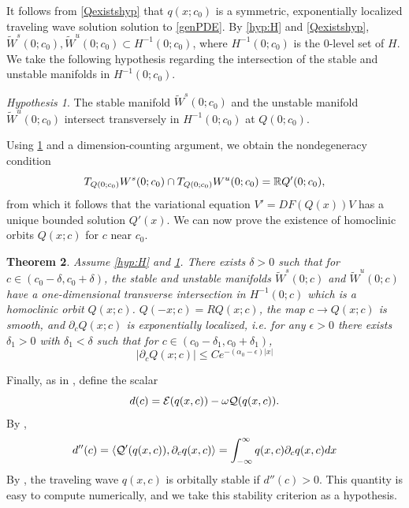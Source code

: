 \documentclass[10pt,reqno]{amsart}
\theoremstyle{plain}
\newtheorem{theorem}{Theorem}
\theoremstyle{definition}
\theoremstyle{remark}
\newtheorem{hypothesis}[theorem]{Hypothesis}
\numberwithin{theorem}{section}
\numberwithin{equation}{section}
\begin{document}
It follows from \cref{Qexistshyp} that $q(x; c_0)$ is a symmetric, exponentially localized traveling wave solution solution to \cref{genPDE}. By \cref{hyp:H} and \cref{Qexistshyp}, $\tilde{W}^s(0; c_0), \tilde{W}^u(0; c_0) \subset H^{-1}(0; c_0)$, where $H^{-1}(0; c_0)$ is the 0-level set of $H$. We take the following hypothesis regarding the intersection of the stable and unstable manifolds in $H^{-1}(0; c_0)$.

\begin{hypothesis}\label{hyp:transverse}
The stable manifold $\tilde{W}^s(0; c_0)$ and the unstable manifold $\tilde{W}^u(0; c_0)$ intersect transversely in $H^{-1}(0; c_0)$ at $Q(0; c_0)$.
\end{hypothesis}

\noi Using \cref{hyp:transverse} and a dimension-counting argument, we obtain the nondegeneracy condition
\begin{equation}\label{nondegencond}
T_{Q(0; c_0)}W^s(0; c_0) \cap T_{Q(0; c_0)}W^u(0; c_0) = \mathbb{R} Q'(0; c_0),
\end{equation}
from which it follows that the variational equation $V' = DF(Q(x))V$ has a unique bounded solution $Q'(x)$. We can now prove the existence of homoclinic orbits $Q(x; c)$ for $c$ near $c_0$.

\begin{theorem}\label{transverseint}
Assume \cref{hyp:H} and \cref{hyp:transverse}. There exists $\delta > 0$ such that for $c \in (c_0 - \delta, c_0 + \delta)$, the stable and unstable manifolds $\tilde{W}^s(0; c)$ and $\tilde{W}^u(0; c)$ have a one-dimensional transverse intersection in $H^{-1}(0; c)$ which is a homoclinic orbit $Q(x; c)$. $Q(-x; c) = R Q(x; c)$, the map $c \rightarrow Q(x; c)$ is smooth, and $\partial_c Q(x; c)$ is exponentially localized, i.e. for any $\epsilon > 0$ there exists $\delta_1 > 0$ with $\delta_1 < \delta$ such that for $c \in (c_0 - \delta_1, c_0 + \delta_1)$,
\begin{equation}\label{Qcbound}
|\partial_c Q(x; c)| \leq C e^{-(\alpha_0 - \epsilon)|x|}
\end{equation}
\end{theorem}

Finally, as in \cite{Grillakis1987}, define the scalar
\begin{equation}
d(c) = \mathcal{E}(q(x, c)) - \omega\mathcal{Q}(q(x, c)).
\end{equation}
By \cite[(2.21)]{Grillakis1987},
\begin{align}\label{ddoubleprime}
d''(c) = \langle \mathcal{Q}'(q(x, c)), \partial_c q(x, c) \rangle
= \int_{-\infty}^\infty q(x, c) \partial_c q(x, c) dx
\end{align}
By \cite[Theorem 3.5]{Grillakis1987}, the traveling wave $q(x, c)$ is orbitally stable if $d''(c) > 0$. This quantity is easy to compute numerically, and we take this stability criterion as a hypothesis.
\end{document}
